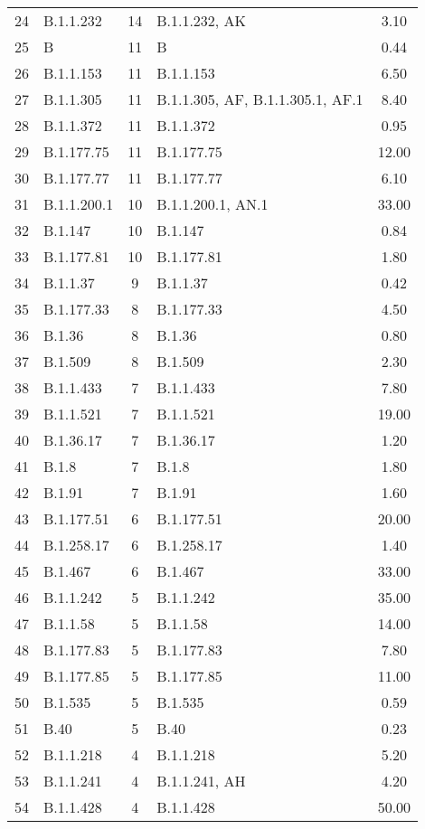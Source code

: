 \begin{longtable}{llcp{4cm}c}
  24 & B.1.1.232 &  14 & B.1.1.232, AK & 3.10 \\ 
  25 & B &  11 & B & 0.44 \\ 
  26 & B.1.1.153 &  11 & B.1.1.153 & 6.50 \\ 
  27 & B.1.1.305 &  11 & B.1.1.305, AF, B.1.1.305.1, AF.1 & 8.40 \\ 
  28 & B.1.1.372 &  11 & B.1.1.372 & 0.95 \\ 
  29 & B.1.177.75 &  11 & B.1.177.75 & 12.00 \\ 
  30 & B.1.177.77 &  11 & B.1.177.77 & 6.10 \\ 
  31 & B.1.1.200.1 &  10 & B.1.1.200.1, AN.1 & 33.00 \\ 
  32 & B.1.147 &  10 & B.1.147 & 0.84 \\ 
  33 & B.1.177.81 &  10 & B.1.177.81 & 1.80 \\ 
  34 & B.1.1.37 &   9 & B.1.1.37 & 0.42 \\ 
  35 & B.1.177.33 &   8 & B.1.177.33 & 4.50 \\ 
  36 & B.1.36 &   8 & B.1.36 & 0.80 \\ 
  37 & B.1.509 &   8 & B.1.509 & 2.30 \\ 
  38 & B.1.1.433 &   7 & B.1.1.433 & 7.80 \\ 
  39 & B.1.1.521 &   7 & B.1.1.521 & 19.00 \\ 
  40 & B.1.36.17 &   7 & B.1.36.17 & 1.20 \\ 
  41 & B.1.8 &   7 & B.1.8 & 1.80 \\ 
  42 & B.1.91 &   7 & B.1.91 & 1.60 \\ 
  43 & B.1.177.51 &   6 & B.1.177.51 & 20.00 \\ 
  44 & B.1.258.17 &   6 & B.1.258.17 & 1.40 \\ 
  45 & B.1.467 &   6 & B.1.467 & 33.00 \\ 
  46 & B.1.1.242 &   5 & B.1.1.242 & 35.00 \\ 
  47 & B.1.1.58 &   5 & B.1.1.58 & 14.00 \\ 
  48 & B.1.177.83 &   5 & B.1.177.83 & 7.80 \\ 
  49 & B.1.177.85 &   5 & B.1.177.85 & 11.00 \\ 
  50 & B.1.535 &   5 & B.1.535 & 0.59 \\ 
  51 & B.40 &   5 & B.40 & 0.23 \\ 
  52 & B.1.1.218 &   4 & B.1.1.218 & 5.20 \\ 
  53 & B.1.1.241 &   4 & B.1.1.241, AH & 4.20 \\ 
  54 & B.1.1.428 &   4 & B.1.1.428 & 50.00 \\ 

\end{longtable}

